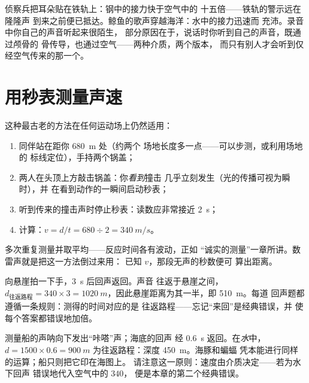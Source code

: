 \begin{example}\label{ex:g7:sound-production:scenes}
侦察兵把耳朵贴在铁轨上：钢中的接力快于空气中的
十五倍——铁轨的警示远在隆隆声
到来之前便已抵达。鲸鱼的歌声穿越海洋：水中的接力迅速而
充沛。录音中你自己的声音听起来很陌生，
部分原因在于，说话时你听到自己的声音，既通过颅骨的
骨传导，也通过空气——两种介质，两个版本，
而只有别人才会听到仅经空气传来的那一个。
\end{example}

\section{用秒表测量声速}

\begin{method}[测量声速]\label{met:g7:sound-production:measure}
这种最古老的方法在任何运动场上仍然适用：
\begin{enumerate}
  \item 同伴站在距你 \qty{680}{m} 处（约两个
        场地长度多一点——可以步测，或利用场地的
        标线定位），手持两个锅盖；
  \item 两人在头顶上方敲击锅盖：你\emph{看到}撞击
        几乎立刻发生（光的传播可视为瞬时），并
        在看到动作的一瞬间启动秒表；
  \item 听到传来的撞击声时停止秒表：读数应非常接近
        \qty{2}{s}；
  \item 计算：$v = d/t = 680 \div 2 = \qty{340}{m/s}$。
\end{enumerate}
多次重复测量并取平均——反应时间各有波动，正如
“诚实的测量”一章所讲。数雷声就是把这一方法倒过来用：
已知 $v$，那段无声的秒数便可
算出距离。
\end{method}

\begin{example}[回声的计算]\label{ex:g7:sound-production:echo}
向悬崖拍一下手，\qty{3}{s} 后回声返回。声音
往返于悬崖之间，$d_{\text{往返路程}} = 340 \times 3 =
\qty{1020}{m}$，因此悬崖距离为其一半，即 \qty{510}{m}。每道
回声题都遵循一条规则：测得的时间对应的是
往返路程——忘记“来回”是经典错误，并
使每个答案都错误地加倍。
\end{example}

\begin{example}[认真的声呐计算]\label{ex:g7:sound-production:sonar}
测量船的声呐向下发出“咔嗒”声；海底的回声
经 \qty{0.6}{s} 返回。在\emph{水}中，$d = 1500 \times 0.6 =
\qty{900}{m}$ 为往返路程：深度 \qty{450}{m}。海豚和蝙蝠
凭本能进行同样的运算；船只则把它印在海图上。
请注意这一原则：速度由介质决定——若为水下回声
错误地代入空气中的 $340$，
便是本章的第二个经典错误。
\end{example}

